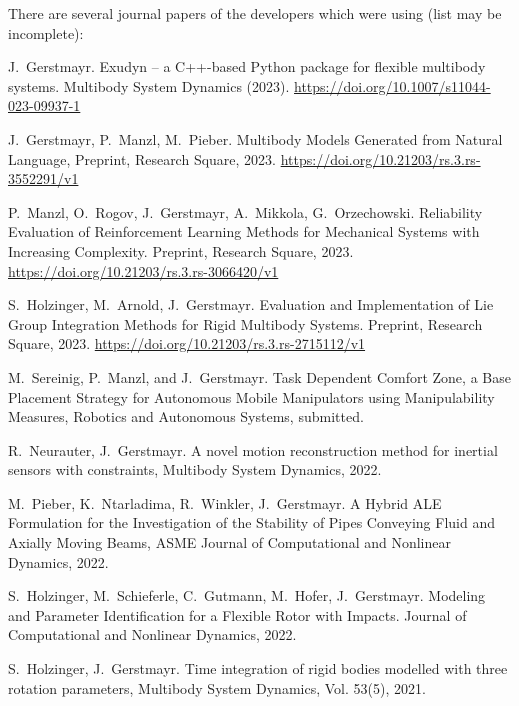 There are several journal papers of the developers which were using \codeName (list may be incomplete):
\bi
  \item J.\ Gerstmayr. Exudyn -- a C++-based Python package for flexible multibody systems. Multibody System Dynamics (2023). \url{https://doi.org/10.1007/s11044-023-09937-1} 
  \item J.\ Gerstmayr, P.\ Manzl, M.\ Pieber. Multibody Models Generated from Natural Language, Preprint, Research Square, 2023. \url{https://doi.org/10.21203/rs.3.rs-3552291/v1} 
  \item P.\ Manzl, O.\ Rogov, J.\ Gerstmayr, A.\ Mikkola, G.\ Orzechowski. Reliability Evaluation of Reinforcement Learning Methods for Mechanical Systems with Increasing Complexity.  Preprint, Research Square, 2023.  \url{https://doi.org/10.21203/rs.3.rs-3066420/v1}
  \item S.\ Holzinger, M.\ Arnold, J.\ Gerstmayr. Evaluation and Implementation of Lie Group Integration Methods for Rigid Multibody Systems. Preprint, Research Square, 2023.  \url{https://doi.org/10.21203/rs.3.rs-2715112/v1} 
  \item M.\ Sereinig, P.\ Manzl, and J.\ Gerstmayr. Task Dependent Comfort Zone, a Base Placement Strategy for Autonomous Mobile Manipulators using Manipulability Measures, Robotics and Autonomous Systems, submitted. \cite{Sereinig2023comfortZone}
  \item R.\ Neurauter, J.\ Gerstmayr. A novel motion reconstruction method for inertial sensors with constraints, Multibody System Dynamics, 2022. \cite{NeurauterGerstmayr2023}
  \item M.\ Pieber, K.\ Ntarladima, R.\ Winkler, J.\ Gerstmayr. A Hybrid ALE Formulation for the Investigation of the Stability of Pipes Conveying Fluid and Axially Moving Beams, ASME Journal of Computational and Nonlinear Dynamics, 2022. 
  \item S.\ Holzinger, M.\ Schieferle, C.\ Gutmann, M.\ Hofer, J.\ Gerstmayr. Modeling and Parameter Identification for a Flexible Rotor with Impacts. Journal of Computational and Nonlinear Dynamics, 2022. 
  \item S.\ Holzinger, J.\ Gerstmayr. Time integration of rigid bodies modelled with three rotation parameters, Multibody System Dynamics, Vol. 53(5), 2021. 
